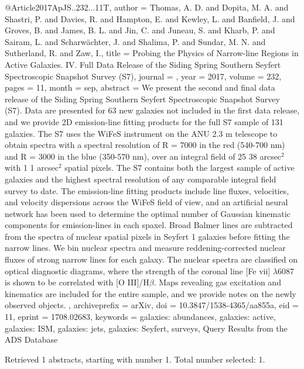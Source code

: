 \documentclass[longauth]{aa}
\begin{document}
{{{{@Article{2017ApJS..232...11T,
  author        = {Thomas, A. D. and Dopita, M. A. and Shastri, P. and Davies, R. and Hampton, E. and Kewley, L. and Banfield, J. and Groves, B. and James, B. L. and Jin, C. and Juneau, S. and Kharb, P. and Sairam, L. and Scharw{\"a}chter, J. and Shalima, P. and Sundar, M. N. and Sutherland, R. and Zaw, I.},
  title         = {Probing the Physics of Narrow-line Regions in Active Galaxies. IV. Full Data Release of the Siding Spring Southern Seyfert Spectroscopic Snapshot Survey (S7)},
  journal       = {\apjs},
  year          = {2017},
  volume        = {232},
  pages         = {11},
  month         = sep,
  abstract      = {We present the second and final data release of the Siding Spring
Southern Seyfert Spectroscopic Snapshot Survey (S7). Data are presented
for 63 new galaxies not included in the first data release, and we
provide 2D emission-line fitting products for the full S7 sample of 131
galaxies. The S7 uses the WiFeS instrument on the ANU 2.3 m telescope to
obtain spectra with a spectral resolution of R = 7000 in the red
(540-700 nm) and R = 3000 in the blue (350-570 nm), over an integral
field of 25 {\times} 38 arcsec$^{2}$ with 1 {\times} 1
arcsec$^{2}$ spatial pixels. The S7 contains both the largest
sample of active galaxies and the highest spectral resolution of any
comparable integral field survey to date. The emission-line fitting
products include line fluxes, velocities, and velocity dispersions
across the WiFeS field of view, and an artificial neural network has
been used to determine the optimal number of Gaussian kinematic
components for emission-lines in each spaxel. Broad Balmer lines are
subtracted from the spectra of nuclear spatial pixels in Seyfert 1
galaxies before fitting the narrow lines. We bin nuclear spectra and
measure reddening-corrected nuclear fluxes of strong narrow lines for
each galaxy. The nuclear spectra are classified on optical diagnostic
diagrams, where the strength of the coronal line [Fe vii] {$\lambda$}6087
is shown to be correlated with [O III]/H{$\beta$}. Maps revealing gas
excitation and kinematics are included for the entire sample, and we
provide notes on the newly observed objects.
},
  archiveprefix = {arXiv},
  doi           = {10.3847/1538-4365/aa855a},
  eid           = {11},
  eprint        = {1708.02683},
  keywords      = {galaxies: abundances, galaxies: active, galaxies: ISM, galaxies: jets, galaxies: Seyfert, surveys},
}
Query Results from the ADS Database


Retrieved 1 abstracts, starting with number 1.  Total number selected: 1.

}}}}
\end{document}
